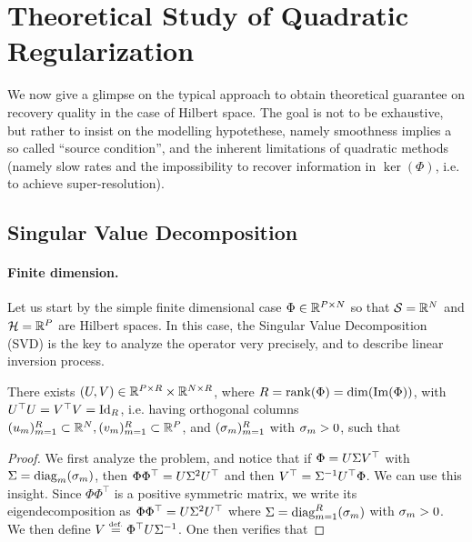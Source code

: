  

\section{Theoretical Study of Quadratic Regularization}

We now give a glimpse on the typical approach to obtain theoretical guarantee on recovery quality in the case of Hilbert space. The goal is not to be exhaustive, but rather to insist on the modelling hypotethese, namely smoothness implies a so called ``source condition'', and the inherent limitations of quadratic methods (namely slow rates and the impossibility to recover information in $\ker(\Phi)$, i.e. to achieve super-resolution). 

\subsection{Singular Value Decomposition}


\paragraph{Finite dimension.}

Let us start by the simple finite dimensional case $\Phi \in \mathbb{R}^{P \times N}$ so that $\mathcal{S}=\mathbb{R}^N$ and $\mathcal{H}=\mathbb{R}^P$ are Hilbert spaces.
%
In this case, the Singular Value Decomposition (SVD) is the key to analyze the operator very precisely, and to describe linear inversion process.  

\begin{prop}[SVD]\label{prop-svd}
	There exists $(U,V) \in \mathbb{R}^{P \times R} \times \mathbb{R}^{N \times R}$, where $R=\operatorname{rank}(\Phi)=\dim(\operatorname{Im}(\Phi))$, with $U^\top U=V^\top V=\mathrm{Id}_R$, i.e. having orthogonal columns $(u_m)_{m=1}^R \subset \mathbb{R}^N, (v_m)_{m=1}^R \subset \mathbb{R}^P$,  and $(\sigma_m)_{m=1}^R$ with $\sigma_m>0$, such that
\end{prop}

\begin{proof}
	We first analyze the problem, and notice that if $\Phi = U \Sigma V^\top$ with $\Sigma = \operatorname{diag}_m(\sigma_m)$, then 
	$\Phi\Phi^\top=U \Sigma^2 U^\top$ and then $V^\top = \Sigma^{-1} U^\top \Phi$.
	We can use this insight. Since $\Phi\Phi^\top$ is a positive symmetric matrix, we write its eigendecomposition as $\Phi\Phi^\top=U \Sigma^2 U^\top$ where $\Sigma = \operatorname{diag}_{m=1}^R(\sigma_m)$ with $\sigma_m>0$. We then define $V \stackrel{\mbox{\upshape\tiny def.}}{=} \Phi^\top U \Sigma^{-1}$.
	One then verifies that 
\end{proof}

